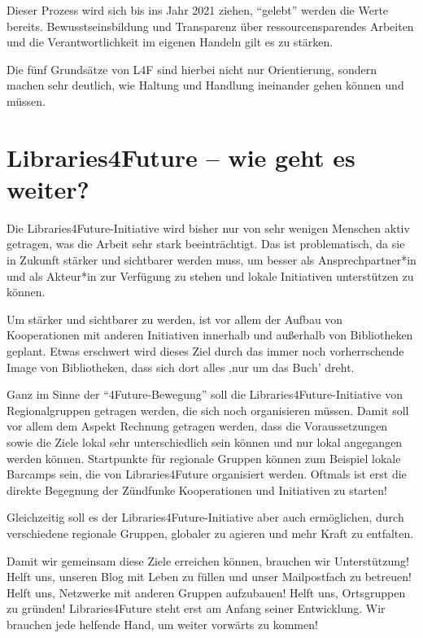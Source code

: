 \documentclass[a4paper,
fontsize=11pt,
oneside,
numbers=noperiodatend,
parskip=half-,
bibliography=totoc,
final
]{scrartcl}
\begin{document}
Dieser Prozess wird sich bis ins Jahr 2021 ziehen, \enquote{gelebt}
werden die Werte bereits. Bewusstseinsbildung und Transparenz über
ressourcensparendes Arbeiten und die Verantwortlichkeit im eigenen
Handeln gilt es zu stärken.

Die fünf Grundsätze von L4F sind hierbei nicht nur Orientierung, sondern
machen sehr deutlich, wie Haltung und Handlung ineinander gehen können
und müssen.

\hypertarget{libraries4future-wie-geht-es-weiter}{%
\section{Libraries4Future -- wie geht es
weiter?}\label{libraries4future-wie-geht-es-weiter}}

Die Libraries4Future-Initiative wird bisher nur von sehr wenigen
Menschen aktiv getragen, was die Arbeit sehr stark beeinträchtigt. Das
ist problematisch, da sie in Zukunft stärker und sichtbarer werden muss,
um besser als Ansprechpartner*in und als Akteur*in zur Verfügung zu
stehen und lokale Initiativen unterstützen zu können.

Um stärker und sichtbarer zu werden, ist vor allem der Aufbau von
Kooperationen mit anderen Initiativen innerhalb und außerhalb von
Bibliotheken geplant. Etwas erschwert wird dieses Ziel durch das immer
noch vorherrschende Image von Bibliotheken, dass sich dort alles ‚nur um
das Buch' dreht.

Ganz im Sinne der \enquote{4Future-Bewegung} soll die
Libraries4Future-Initiative von Regionalgruppen getragen werden, die
sich noch organisieren müssen. Damit soll vor allem dem Aspekt Rechnung
getragen werden, dass die Voraussetzungen sowie die Ziele lokal sehr
unterschiedlich sein können und nur lokal angegangen werden können.
Startpunkte für regionale Gruppen können zum Beispiel lokale Barcamps
sein, die von Libraries4Future organisiert werden. Oftmals ist erst die
direkte Begegnung der Zündfunke Kooperationen und Initiativen zu
starten!

Gleichzeitig soll es der Libraries4Future-Initiative aber auch
ermöglichen, durch verschiedene regionale Gruppen, globaler zu agieren
und mehr Kraft zu entfalten.

Damit wir gemeinsam diese Ziele erreichen können, brauchen wir
Unterstützung! Helft uns, unseren Blog mit Leben zu füllen und unser
Mailpostfach zu betreuen! Helft uns, Netzwerke mit anderen Gruppen
aufzubauen! Helft uns, Ortsgruppen zu gründen! Libraries4Future steht
erst am Anfang seiner Entwicklung. Wir brauchen jede helfende Hand, um
weiter vorwärts zu kommen!
\end{document}
